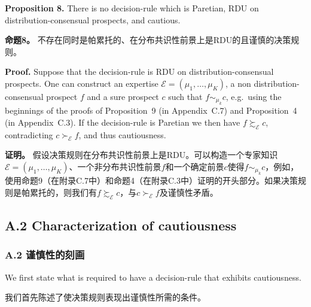 \documentclass[12pt,a4paper]{article}
\newenvironment{original}
  {\par\noindent\ignorespaces}
  {\par}
\newenvironment{translation}
  {\par\noindent{\color{transblue}\ignorespaces}}
  {\par\medskip}
\begin{document}
\begin{original}
\textbf{Proposition 8.} There is no decision-rule which is Paretian, RDU on distribution-consensual prospects, and cautious.
\end{original}

\begin{translation}
\textbf{命题8。} 不存在同时是帕累托的、在分布共识性前景上是RDU的且谨慎的决策规则。
\end{translation}

\begin{original}
\textbf{Proof.} Suppose that the decision-rule is RDU on distribution-consensual prospects. One can construct an expertise $\mathcal{E} = (\mu_{1}, \dots, \mu_{K})$, a non distribution-consensual prospect $f$ and a sure prospect $c$ such that $f \sim_{\mu_{k}} c$, e.g.\ using the beginnings of the proofs of Proposition~9 (in Appendix~C.7) and Proposition~4 (in Appendix~C.3). If the decision-rule is Paretian we then have $f \succsim_{\mathcal{E}} c$, contradicting $c \succ_{\mathcal{E}} f$, and thus cautiousness.
\end{original}

\begin{translation}
\textbf{证明。} 假设决策规则在分布共识性前景上是RDU。可以构造一个专家知识$\mathcal{E} = (\mu_{1}, \dots, \mu_{K})$、一个非分布共识性前景$f$和一个确定前景$c$使得$f \sim_{\mu_{k}} c$，例如，使用命题9（在附录C.7中）和命题4（在附录C.3中）证明的开头部分。如果决策规则是帕累托的，则我们有$f \succsim_{\mathcal{E}} c$，与$c \succ_{\mathcal{E}} f$及谨慎性矛盾。
\end{translation}

\subsection*{A.2 Characterization of cautiousness}
{\color{transblue}\subsubsection*{A.2 谨慎性的刻画}}

\begin{original}
We first state what is required to have a decision-rule that exhibits cautiousness.
\end{original}

\begin{translation}
我们首先陈述了使决策规则表现出谨慎性所需的条件。
\end{translation}
\end{document}
